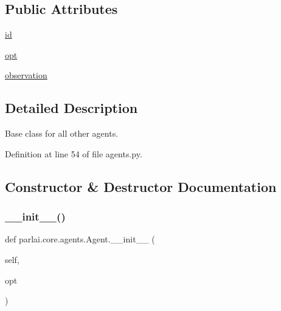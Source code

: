\subsection*{Public Attributes}
\begin{DoxyCompactItemize}
\item 
\hyperlink{classparlai_1_1core_1_1agents_1_1Agent_ac00c13f4c7dd1263bf9203fa96dd2366}{id}
\item 
\hyperlink{classparlai_1_1core_1_1agents_1_1Agent_ab3b45d2754244608c75d4068b90cd051}{opt}
\item 
\hyperlink{classparlai_1_1core_1_1agents_1_1Agent_aedbecc4b4aa7af7413882a0429e0f1db}{observation}
\end{DoxyCompactItemize}


\subsection{Detailed Description}
\begin{DoxyVerb}Base class for all other agents.
\end{DoxyVerb}
 

Definition at line 54 of file agents.\+py.



\subsection{Constructor \& Destructor Documentation}
\mbox{\label{classparlai_1_1core_1_1agents_1_1Agent_ade454c86dc623c46d218ca5544d49596}} 
\subsubsection{\texorpdfstring{\+\_\+\+\_\+init\+\_\+\+\_\+()}{\_\_init\_\_()}}
{\footnotesize\ttfamily def parlai.\+core.\+agents.\+Agent.\+\_\+\+\_\+init\+\_\+\+\_\+ (\begin{DoxyParamCaption}\item[{}]{self,  }\item[{}]{opt }\end{DoxyParamCaption})}



